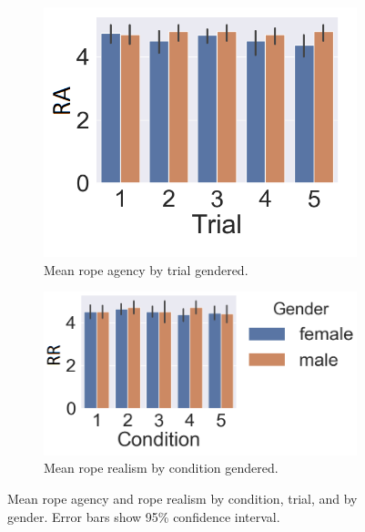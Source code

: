 \begin{figure}[H]
\begin{subfigure}[b]{0.3\textwidth}
     \label{fig:ropeOwnCondGend}
 \end{subfigure}
   \begin{subfigure}[b]{0.3\textwidth}
     \centering
     \includegraphics[scale=0.3]{Files/Plots/rotrial_gen.png}
      \caption{Mean rope agency by trial gendered.}
     \label{fig:ropeOwnTrialGend}
 \end{subfigure}
  \hspace{5mm}
  \begin{subfigure}[b]{0.3\textwidth}
     \centering
     \includegraphics[scale=0.35]{Files/Plots/rrcond_gen.png}
     \caption{Mean rope realism by condition gendered.}
     \label{fig:ropeRealCondGend}
 \end{subfigure}
     \caption{Mean rope agency and rope realism by condition, trial, and by gender. Error bars show 95\%  confidence interval.}
    \label{fig:ropeOwnershipRealism}
\end{figure}

